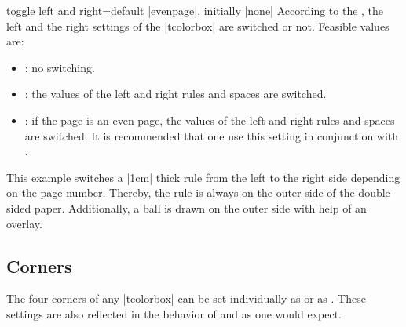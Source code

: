 {\tcbusetemp}


\clearpage
\begin{docTcbKey}{toggle left and right}{=}{default |evenpage|, initially |none|}
  According to the , the left and the right settings of
  the |tcolorbox| are switched or not. Feasible values are:
  \begin{itemize}
  \item{}: no switching.
  \item{}: the values of the left and right rules and spaces are switched.
  \item{}: if the page is an even page, the values of the left and
    right rules and spaces are switched. It is recommended that one use this setting in
    conjunction with .
  \end{itemize}
\begin{dispListing}
\begin{tcolorbox}[skin=enhancedmiddle,breakable,
  check odd page,toggle left and right,
  boxrule=0mm,top=0mm,bottom=0mm,left=1mm,right=1mm,
  rightrule=1cm,colupper=blue!25!black,
  interior style={fill overzoom image=lichtspiel.jpg,fill image opacity=0.25},
  frame style={pattern=crosshatch dots light steel blue},
  overlay={%
    \ifoddpage\coordinate (X) at ([xshift=-5mm]frame.east);
         \else\coordinate (X) at ([xshift=5mm]frame.west);\fi
    \fill[shading=ball,ball color=blue!50!white,opacity=0.5] (X) circle (4mm);}]
\lipsum[1-6]
\end{tcolorbox}
\end{dispListing}
\medskip

This example switches a |1cm| thick rule from the left to the right side
depending on the page number. Thereby, the rule is always on the outer side
of the double-sided paper. Additionally, a ball is drawn on the outer side
with help of an overlay.
\bigskip

\tcbusetemp
\end{docTcbKey}

\clearpage
\subsection{Corners}\label{subsec:corners}

The four corners of any |tcolorbox| can be set individually as
 or as .
These settings are also reflected in the behavior of 
and  as one would expect.

